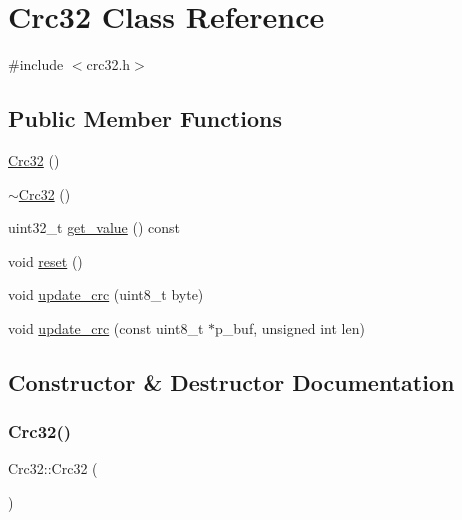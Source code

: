 \hypertarget{class_crc32}{}\section{Crc32 Class Reference}
\label{class_crc32}


{\ttfamily \#include $<$crc32.\+h$>$}

\subsection*{Public Member Functions}
\begin{DoxyCompactItemize}
\item 
\hyperlink{class_crc32_ae9fe98ed803007de13e63c03e80fe322}{Crc32} ()
\item 
\hyperlink{class_crc32_a007ddcc8fdae521f8635cd93bde4d9e7}{$\sim$\+Crc32} ()
\item 
uint32\+\_\+t \hyperlink{class_crc32_a9348375ed3372b4287ed821018de5c9d}{get\+\_\+value} () const
\item 
void \hyperlink{class_crc32_a3a7ab26889bce23552efd6f519b27002}{reset} ()
\item 
void \hyperlink{class_crc32_a22582588a048f4fadd2893a32e283b1b}{update\+\_\+crc} (uint8\+\_\+t byte)
\item 
void \hyperlink{class_crc32_abbe8ee7251b1a54e77e8a8c07af4d85d}{update\+\_\+crc} (const uint8\+\_\+t $\ast$p\+\_\+buf, unsigned int len)
\end{DoxyCompactItemize}


\subsection{Constructor \& Destructor Documentation}
\hypertarget{class_crc32_ae9fe98ed803007de13e63c03e80fe322}{}\label{class_crc32_ae9fe98ed803007de13e63c03e80fe322} 
\subsubsection{\texorpdfstring{Crc32()}{Crc32()}}
{\footnotesize\ttfamily Crc32\+::\+Crc32 (\begin{DoxyParamCaption}{ }\end{DoxyParamCaption})}

\hypertarget{class_crc32_a007ddcc8fdae521f8635cd93bde4d9e7}{}\label{class_crc32_a007ddcc8fdae521f8635cd93bde4d9e7} 
